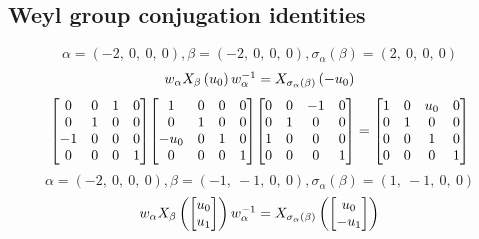 \documentclass[11pt]{article}
\theoremstyle{definition}
\begin{document}
\subsection{Weyl group conjugation identities}

\providecommand{\scaletoalign}[2]{%
  \sbox0{$#2$}%
  \ifdim\wd0>#1\relax 
    \resizebox{#1}{!}{\usebox0}%
  \else 
    \usebox0%
  \fi 
}
\[
\alpha = \left( -2, \  0, \  0, \  0\right), \beta = \left( -2, \  0, \  0, \  0\right), \sigma_{\alpha}(\beta) = \left( 2, \  0, \  0, \  0\right)
\]
\[
\scaletoalign{\textwidth}{w_{\alpha} X_{\beta}\left(u_{0}\right) w_{\alpha}^{-1} = X_{\sigma_{\alpha}\left(\beta\right)}\left(- u_{0}\right)}
\]
\[
\scaletoalign{\textwidth}{{\left[\begin{matrix}0 & 0 & 1 & 0\\0 & 1 & 0 & 0\\-1 & 0 & 0 & 0\\0 & 0 & 0 & 1\end{matrix}\right]} {\left[\begin{matrix}1 & 0 & 0 & 0\\0 & 1 & 0 & 0\\- u_{0} & 0 & 1 & 0\\0 & 0 & 0 & 1\end{matrix}\right]} {\left[\begin{matrix}0 & 0 & -1 & 0\\0 & 1 & 0 & 0\\1 & 0 & 0 & 0\\0 & 0 & 0 & 1\end{matrix}\right]} = {\left[\begin{matrix}1 & 0 & u_{0} & 0\\0 & 1 & 0 & 0\\0 & 0 & 1 & 0\\0 & 0 & 0 & 1\end{matrix}\right]}}
\]
\[
\alpha = \left( -2, \  0, \  0, \  0\right), \beta = \left( -1, \  -1, \  0, \  0\right), \sigma_{\alpha}(\beta) = \left( 1, \  -1, \  0, \  0\right)
\]
\[
\scaletoalign{\textwidth}{w_{\alpha} X_{\beta}\left(\left[\begin{matrix}u_{0}\\u_{1}\end{matrix}\right]\right) w_{\alpha}^{-1} = X_{\sigma_{\alpha}\left(\beta\right)}\left(\left[\begin{matrix}u_{0}\\- u_{1}\end{matrix}\right]\right)}
\]
\end{document}
